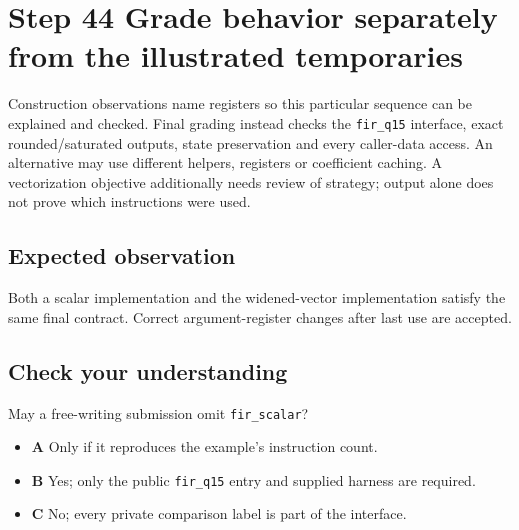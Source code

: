 \section{Step 44 Grade behavior separately from the illustrated temporaries}\label{fir-s44}

Construction observations name registers so this particular sequence can be explained and checked. Final grading instead checks the \texttt{fir\_q15} interface, exact rounded/saturated outputs, state preservation and every caller-data access. An alternative may use different helpers, registers or coefficient caching. A vectorization objective additionally needs review of strategy; output alone does not prove which instructions were used.

\subsection{Expected observation}
Both a scalar implementation and the widened-vector implementation satisfy the same final contract. Correct argument-register changes after last use are accepted.

\subsection{Check your understanding}
May a free-writing submission omit \texttt{fir\_scalar}?

\begin{itemize}
  \item \textbf{A} Only if it reproduces the example’s instruction count.
  \item \textbf{B} Yes; only the public \texttt{fir\_q15} entry and supplied harness are required.
  \item \textbf{C} No; every private comparison label is part of the interface.
\end{itemize}
